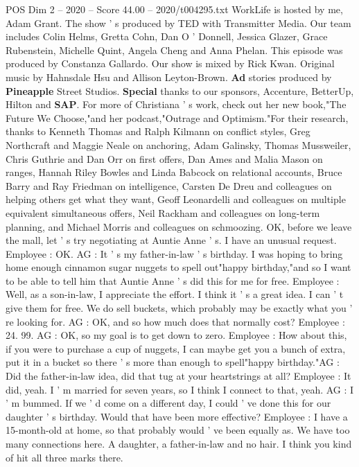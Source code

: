 \begin{textsample}{POS Dim 2 – 2020 – Score 44.00 – 2020/t004295.txt}
WorkLife is hosted by me, Adam Grant.
The show ' s produced by TED with Transmitter Media.
Our team includes Colin Helms, Gretta Cohn, Dan O ' Donnell, Jessica Glazer, Grace Rubenstein, Michelle Quint, Angela Cheng and Anna Phelan.
This episode was produced by Constanza Gallardo.
Our show is mixed by Rick Kwan.
Original music by Hahnsdale Hsu and Allison Leyton-Brown. \textbf{Ad} stories produced by \textbf{Pineapple} Street Studios. \textbf{Special} thanks to our sponsors, Accenture, BetterUp, Hilton and \textbf{SAP}.
For more of Christiana ' s work, check out her new book,"The Future We Choose,"and her podcast,"Outrage and Optimism."For their research, thanks to Kenneth Thomas and Ralph Kilmann on conflict styles, Greg Northcraft and Maggie Neale on anchoring, Adam Galinsky, Thomas Mussweiler, Chris Guthrie and Dan Orr on first offers, Dan Ames and Malia Mason on ranges, Hannah Riley Bowles and Linda Babcock on relational accounts, Bruce Barry and Ray Friedman on intelligence, Carsten De Dreu and colleagues on helping others get what they want, Geoff Leonardelli and colleagues on multiple equivalent simultaneous offers, Neil Rackham and colleagues on long-term planning, and Michael Morris and colleagues on schmoozing.
OK, before we leave the mall, let ' s try negotiating at Auntie Anne ' s.
I have an unusual request.
Employee : OK.
AG : It ' s my father-in-law ' s birthday.
I was hoping to bring home enough cinnamon sugar nuggets to spell out"happy birthday,"and so I want to be able to tell him that Auntie Anne ' s did this for me for free.
Employee : Well, as a son-in-law, I appreciate the effort.
I think it ' s a great idea.
I can ' t give them for free.
We do sell buckets, which probably may be exactly what you ' re looking for.
AG : OK, and so how much does that normally cost?
Employee : 24. 99.
AG : OK, so my goal is to get down to zero.
Employee : How about this, if you were to purchase a cup of nuggets, I can maybe get you a bunch of extra, put it in a bucket so there ' s more than enough to spell"happy birthday."AG : Did the father-in-law idea, did that tug at your heartstrings at all?
Employee : It did, yeah.
I ' m married for seven years, so I think I connect to that, yeah.
AG : I ' m bummed.
If we ' d come on a different day, I could ' ve done this for our daughter ' s birthday.
Would that have been more effective?
Employee : I have a 15-month-old at home, so that probably would ' ve been equally as.
We have too many connections here.
A daughter, a father-in-law and no hair.
I think you kind of hit all three marks there.

\end{textsample}
